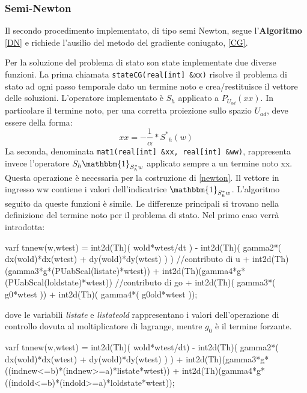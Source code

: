 \subsubsection{Semi-Newton}
Il secondo procedimento implementato, di tipo semi Newton, segue l'\textbf{Algoritmo} \ref{DN} e richiede l'ausilio del metodo del gradiente coniugato, \ref{CG}.
\par
Per la soluzione del problema di stato son state implementate due diverse funzioni. La prima chiamata \texttt{stateCG(real[int] \&xx)} risolve il problema di stato ad ogni passo temporale dato un termine noto e crea/restituisce il vettore delle soluzioni. L'operatore implementato è $S_h$ applicato a $P_{U_{ad}}(xx)$.
In particolare il termine noto, per una corretta proiezione sullo spazio $U_{ad}$, deve essere della forma:
\begin{equation}
xx = -\frac{1}{\alpha}*{S^{*}}_{h}(w)
\end{equation}
La seconda, denominata \texttt{mat1(real[int] \&xx, real[int] \&ww)}, rappresenta invece l'operatore $S_h\mathbbm{1}_{S^*_hw}$ applicato sempre a un termine noto xx. Questa operazione è necessaria per la costruzione di \eqref{newton}. Il vettore in ingresso ww contiene i valori dell'indicatrice $\mathbbm{1}_{S^*_hw}$.
L'algoritmo seguito da queste funzioni è simile. Le differenze principali si trovano nella definizione del termine noto per il problema di stato. Nel primo caso verrà introdotta:
\begin{Code}[caption={Matrice \texttt{tnnew(w,wtest)} per \texttt{stateCG(real[int] \&xx)}}]
varf tnnew(w,wtest) =   int2d(Th)( wold*wtest/dt )
				  	  - int2d(Th)( gamma2*( dx(wold)*dx(wtest) + dy(wold)*dy(wtest) ) )
						//contributo di u
					  + int2d(Th)(gamma3*g*(PUabScal(listate)*wtest))
					  + int2d(Th)(gamma4*g*(PUabScal(loldstate)*wtest)) 
						//contributo di go 
					  + int2d(Th)( gamma3*( g0*wtest ))
			 		  + int2d(Th)( gamma4*( g0old*wtest ));
\end{Code}
dove le variabili \textit{listate} e \textit{listateold} rappresentano i valori dell'operazione di controllo dovuta al moltiplicatore di lagrange, mentre $g_0$ è il termine forzante.
\begin{Code}[caption={Matrice \texttt{tnnew(w,wtest)} per \texttt{mat1(real[int] \&xx, real[int] \&ww)}}]
varf tnnew(w,wtest) =  int2d(Th)( wold*wtest/dt) 
	  				 - int2d(Th)( gamma2*( dx(wold)*dx(wtest) + dy(wold)*dy(wtest) ) ) 
				     + int2d(Th)(gamma3*g*((indnew<=b)*(indnew>=a)*listate*wtest))
					 + int2d(Th)(gamma4*g*((indold<=b)*(indold>=a)*loldstate*wtest));
\end{Code}
